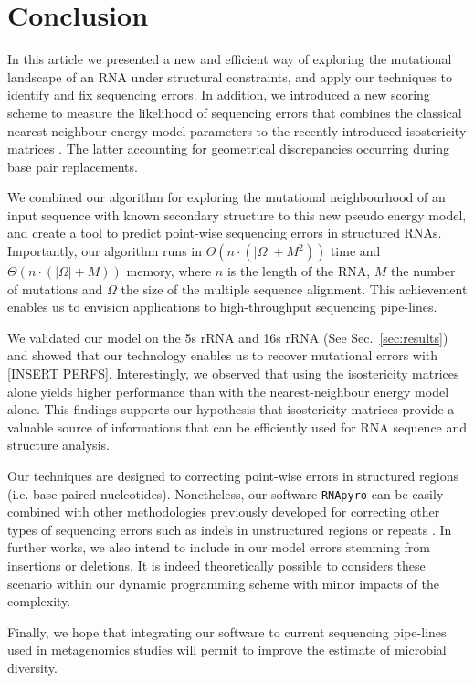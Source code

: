 \section{Conclusion}
\label{sec:conclusion}

In this article we presented a new and efficient way of exploring the mutational landscape of an RNA under structural constraints,
and apply our techniques to identify and fix sequencing errors. In addition, we introduced a new scoring scheme to measure the
likelihood of sequencing errors that combines the classical nearest-neighbour energy model parameters \cite{Turner2010} to the recently introduced
isostericity matrices \cite{Stombaugh2009}. The latter accounting for geometrical discrepancies occurring during base pair replacements.

We combined our algorithm for exploring the mutational neighbourhood of an input sequence with known secondary structure to
this new pseudo energy model, and create a tool to predict point-wise sequencing errors in structured RNAs.
Importantly, our algorithm runs in  $\Theta(n\cdot(|\Omega|+M^2))$ time and $\Theta(n\cdot(|\Omega|+M))$ memory, where $n$ is the length of the RNA,
$M$ the number of mutations and $\Omega$ the size of the multiple sequence alignment. This achievement enables us to envision applications to high-throughput sequencing pipe-lines.

We validated our model on the 5s rRNA and 16s rRNA (See Sec.~\ref{sec:results}) and showed that our technology enables us to recover 
mutational errors with [INSERT PERFS]. Interestingly, we observed that using the isostericity matrices alone yields higher performance than with the 
nearest-neighbour energy model alone. This findings supports our hypothesis that isostericity matrices provide a valuable source of informations that
can be efficiently used for RNA sequence and structure analysis.

Our techniques are designed to correcting point-wise errors in structured regions (i.e. base paired nucleotides). Nonetheless, our software 
\texttt{RNApyro} can be easily combined with other methodologies previously developed for correcting other types of sequencing errors such as indels in 
unstructured regions or repeats \cite{Quinlan2008,Quince:2009uq}. In further works, we also intend to include in our model errors stemming from insertions or deletions. It is indeed theoretically possible to considers these scenario within our dynamic programming scheme \cite{Waldispuhl:2002fk} with minor impacts of the complexity.

Finally, we hope that integrating our software to current sequencing pipe-lines used in metagenomics studies will permit to improve the estimate of microbial diversity.


